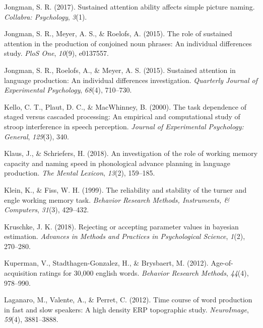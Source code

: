 \documentclass[
  man,floatsintext]{apa6}
\newlength{\cslhangindent}
\newlength{\cslentryspacingunit} %
\newenvironment{CSLReferences}[2] %
 {%
  \setlength{\parindent}{0pt}
  \ifodd #1
  \let\oldpar\par
  \def\par{\hangindent=\cslhangindent\oldpar}
  \fi
  \setlength{\parskip}{#2\cslentryspacingunit}
 }%
 {}
\begin{document}
\begin{CSLReferences}{1}{0}
\leavevmode{}%
Jongman, S. R. (2017). Sustained attention ability affects simple picture naming. \emph{Collabra: Psychology}, \emph{3}(1).

\leavevmode{}%
Jongman, S. R., Meyer, A. S., \& Roelofs, A. (2015). The role of sustained attention in the production of conjoined noun phrases: An individual differences study. \emph{PloS One}, \emph{10}(9), e0137557.

\leavevmode{}%
Jongman, S. R., Roelofs, A., \& Meyer, A. S. (2015). Sustained attention in language production: An individual differences investigation. \emph{Quarterly Journal of Experimental Psychology}, \emph{68}(4), 710--730.

\leavevmode{}%
Kello, C. T., Plaut, D. C., \& MacWhinney, B. (2000). The task dependence of staged versus cascaded processing: An empirical and computational study of stroop interference in speech perception. \emph{Journal of Experimental Psychology: General}, \emph{129}(3), 340.

\leavevmode{}%
Klaus, J., \& Schriefers, H. (2018). An investigation of the role of working memory capacity and naming speed in phonological advance planning in language production. \emph{The Mental Lexicon}, \emph{13}(2), 159--185.

\leavevmode{}%
Klein, K., \& Fiss, W. H. (1999). The reliability and stability of the turner and engle working memory task. \emph{Behavior Research Methods, Instruments, \& Computers}, \emph{31}(3), 429--432.

\leavevmode{}%
Kruschke, J. K. (2018). Rejecting or accepting parameter values in bayesian estimation. \emph{Advances in Methods and Practices in Psychological Science}, \emph{1}(2), 270--280.

\leavevmode{}%
Kuperman, V., Stadthagen-Gonzalez, H., \& Brysbaert, M. (2012). Age-of-acquisition ratings for 30,000 english words. \emph{Behavior Research Methods}, \emph{44}(4), 978--990.

\leavevmode{}%
Laganaro, M., Valente, A., \& Perret, C. (2012). Time course of word production in fast and slow speakers: A high density ERP topographic study. \emph{NeuroImage}, \emph{59}(4), 3881--3888.


\end{CSLReferences}
\end{document}
